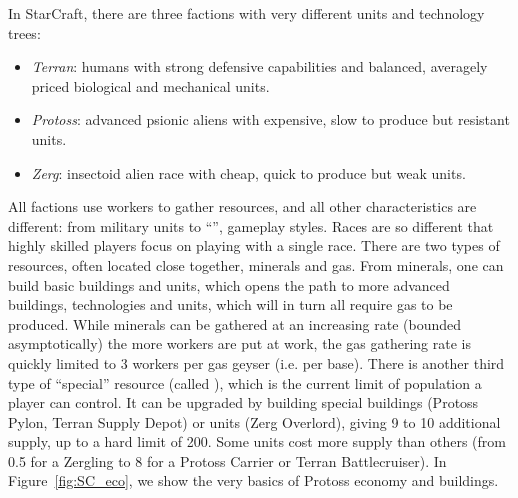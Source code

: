 In StarCraft, there are three factions with very different units and technology trees:
\begin{itemize}
    \item \textit{Terran}: humans with strong defensive capabilities and balanced, averagely priced biological and mechanical units.
    \item \textit{Protoss}: advanced psionic aliens with expensive, slow to produce but resistant units.
    \item \textit{Zerg}: insectoid alien race with cheap, quick to produce but weak units.
\end{itemize}

All factions use workers to gather resources, and all other characteristics are different: from military units to ``'', gameplay styles. Races are so different that highly skilled players focus on playing with a single race. There are two types of resources, often located close together, minerals and gas. From minerals, one can build basic buildings and units, which opens the path to more advanced buildings, technologies and units, which will in turn all require gas to be produced. While minerals can be gathered at an increasing rate (bounded asymptotically) the more workers are put at work, the gas gathering rate is quickly limited to 3 workers per gas geyser (i.e. per base). There is another third type of ``special'' resource (called \textit{}), which is the current limit of population a player can control. It can be upgraded by building special buildings (Protoss Pylon, Terran Supply Depot) or units (Zerg Overlord), giving 9 to 10 additional supply, up to a hard limit of 200. Some units cost more supply than others (from 0.5 for a Zergling to 8 for a Protoss Carrier or Terran Battlecruiser). In Figure~\ref{fig:SC_eco}, we show the very basics of Protoss economy and buildings. %

